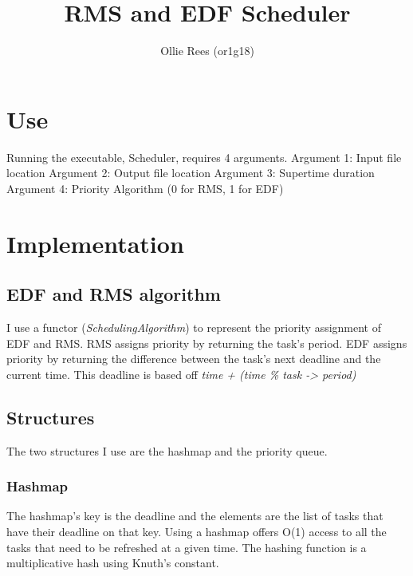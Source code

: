 \documentclass{article}
\title{RMS and EDF Scheduler}
\author{Ollie Rees (or1g18)}
\begin{document}
    \maketitle
    \tableofcontents
    \section{Use}
    Running the executable, Scheduler, requires 4 arguments.
    \newline
    Argument 1: Input file location
    \newline
    Argument 2: Output file location
    \newline
    Argument 3: Supertime duration
    \newline
    Argument 4: Priority Algorithm (0 for RMS, 1 for EDF) 
    \section{Implementation}
    \subsection{EDF and RMS algorithm}
    I use a functor (\textit{SchedulingAlgorithm}) to represent the priority assignment of EDF and RMS. \newline \newline
    RMS assigns priority by returning the task's period. \newline \newline 
    EDF assigns priority by returning the difference between the task's next deadline and the current time. \newline 
    This deadline is based off \textit{time + (time \% task -> period)} 
    \subsection{Structures}
    The two structures I use are the hashmap and the priority queue. \newline
    \subsubsection{Hashmap}
    The hashmap's key is the deadline and the elements are the list of tasks that have their deadline on that key. 
    \newline
    Using a hashmap offers O(1) access to all the tasks that need to be refreshed at a given time. 
    \newline
    The hashing function is a multiplicative hash using Knuth's constant.
\end{document}
